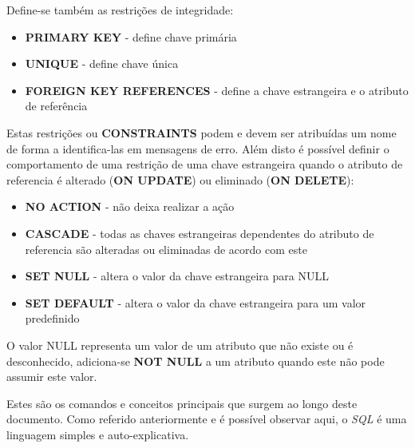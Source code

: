 \documentclass[11pt,twoside,a4paper]{report}
\begin{document}
Define-se também as restrições de integridade:
\begin{itemize}
	\item \textbf{PRIMARY KEY} - define chave primária
	\item \textbf{UNIQUE} - define chave única
	\item \textbf{FOREIGN KEY REFERENCES} - define a chave estrangeira e o atributo de referência
\end{itemize}
Estas restrições ou \textbf{CONSTRAINTS} podem e devem ser atribuídas um nome de forma a identifica-las em mensagens de erro. Além disto é possível definir o comportamento de uma restrição de uma chave estrangeira quando o atributo de referencia é alterado (\textbf{ON UPDATE}) ou eliminado (\textbf{ON DELETE}):
\begin{itemize}
	\item \textbf{NO ACTION} - não deixa realizar a ação
	\item \textbf{CASCADE} - todas as chaves estrangeiras dependentes do atributo de referencia são alteradas ou eliminadas de acordo com este
	\item \textbf{SET NULL} - altera o valor da chave estrangeira para NULL
	\item \textbf{SET DEFAULT} - altera o valor da chave estrangeira para um valor predefinido
\end{itemize}
O valor NULL representa um valor de um atributo que não existe ou é desconhecido, adiciona-se \textbf{NOT NULL} a um atributo quando este não pode assumir este valor.\par 
Estes são os comandos e conceitos principais que surgem ao longo deste documento. Como referido anteriormente e é possível observar aqui, o \textit{SQL} é uma linguagem simples e auto-explicativa.
\end{document}
